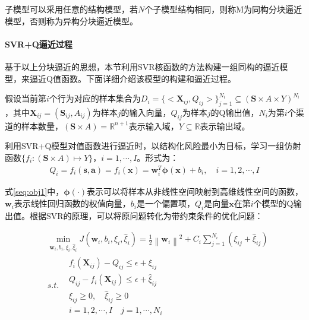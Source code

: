 子模型可以采用任意的结构模型，若$N$个子模型结构相同，则称M为同构分块逼近模型，否则称为异构分块逼近模型。

\paragraph{SVR+Q逼近过程}
基于以上分块逼近的思想，本节利用SVR核函数的方法构建一组同构的逼近模型，来逼近Q值函数。下面详细介绍该模型的构建和逼近过程。

假设当前第$i$个行为对应的样本集合为$D_{i}=\{<\bm{X}_{ij}, Q_{ij}>\}_{j=1}^{N_{i}} \subseteq (\bm{S} \times A \times Y)^{N_{i}}$，其中$\bm{X}_{ij}=(\bm{S}_{ij}, A_{ij})$为样本$j$的输入向量，$Q_{ij}$为样本$j$的Q输出值，$N_{i}$为第$i$个渠道的样本数量，$(\bm{S} \times A) = \mathbb{R}^{n+1}$表示输入域，$Y \subseteq \mathbb{R}$表示输出域。

利用SVR+Q模型对值函数进行逼近时，以结构化风险最小为目标，学习一组仿射函数$\{f_{i}:(\bm{S} \times A) \mapsto Y\}$，$i=1,\cdots,I$。形式为：
\begin{equation}\label{seq:obj1}
\begin{aligned}
Q_{i}=f_{i}(\bm{s,a})=f_{i}(\bm{x})=\bm{w}_{i}^{T} \bm{\phi}(\bm{x}) + b_{i}, \quad i=1,2,\cdots,I
\end{aligned}
\end{equation}

式\eqref{seq:obj1}中，$\bm{\phi}(\cdot)$表示可以将样本从非线性空间映射到高维线性空间的函数，$\bm{w}_{i}$表示线性回归函数的权值向量，$b_{i}$是一个偏置项，$Q_{i}$是向量$\bm{x}$在第$i$个模型的Q输出值。根据SVR的原理，可以将原问题转化为带约束条件的优化问题：

\begin{equation}\label{seq:svr_ori}
\begin{split}
& \min_{\bm{w}_{i}, b_{i},\xi_{i}, \hat{\xi}_{i}}  J(\bm{w}_{i},b_{i},\xi_{i},\hat{\xi}_{i}) = \frac{1}{2} \left \| \bm{w}_{i} \right \|^{2} + C_{i} \sum_{j=1}^{N_{i}}(\xi_{ij}+\hat{\xi}_{ij})\\ 
& s.t. \begin{matrix}
& f_{i}(\bm{X}_{ij}) - Q_{ij} \leqslant \epsilon + \xi_{ij}\\
&Q_{ij} - f_{i}(\bm{X}_{ij})  \leqslant \epsilon + \hat{\xi}_{ij} \\
&\xi_{ij} \geqslant 0, \quad \hat{\xi}_{ij} \geqslant 0\\
& i=1,2,\cdots,I \quad j=1,\cdots,N_{i}
\end{matrix}
\end{split}
\end{equation}

